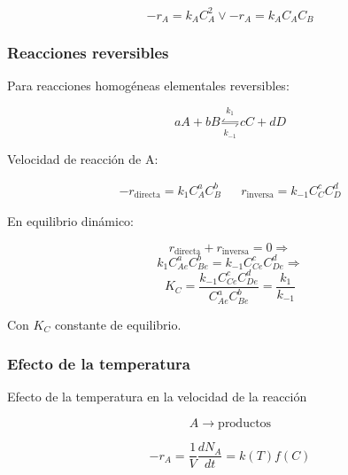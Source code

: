             
            \begin{equation}
            \label{eq:segundo_orden}
                -r_{A} = k_{A} C_{A}^{2} \vee -r_{A} = k_{A} C_{A} C_{B}
            \end{equation}
            
        \subsubsection{Reacciones reversibles}
        
        Para reacciones homogéneas elementales reversibles:
        
        \[aA + bB \underset{k_{-1}}{\overset{k_{1}}{\leftrightharpoons}} cC + dD\]
        
        Velocidad de reacción de A:
        
        \begin{equation}
        \label{eq:reaccion_reversible}
            \begin{matrix}
                -r_{\text{directa}} = k_{1}C_{A}^{a}C_{B}^{b} & & r_{\text{inversa}} = k_{-1}C_{C}^{c}C_{D}^{d}
            \end{matrix}
        \end{equation}
        
        En equilibrio dinámico:
        
        \[r_{\text{directa}} + r_{\text{inversa}} = 0 \Rightarrow\]
        \[k_{1}C_{Ae}^{a}C_{Be}^{b} = k_{-1}C_{Ce}^{c}C_{De}^{d} \Rightarrow\]
        \begin{equation}
        \label{eq:contantes_reversibles}
            K_{C} = \frac{k_{-1}C_{Ce}^{c}C_{De}^{d}}{C_{Ae}^{a}C_{Be}^{b}} = \frac{k_{1}}{k_{-1}}
        \end{equation}
        
        Con \(K_{C}\) constante de equilibrio.
    
        \subsubsection{Efecto de la temperatura}
        
        Efecto de la temperatura en la velocidad de la reacción
        
        \[A \rightarrow \text{productos}\]
        
        \begin{equation}
        \label{eq:velocidad_vs_temperatura}
            -r_{A} = \frac{1}{V}\frac{dN_{A}}{dt} = k\left ( T \right ) f \left ( C \right )
        \end{equation}
        
